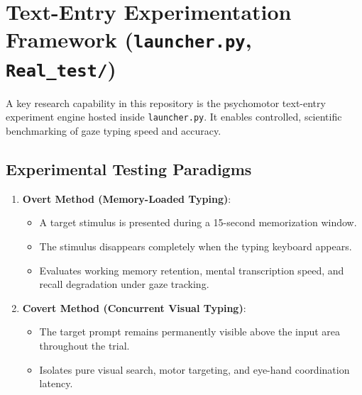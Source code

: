 \documentclass[11pt,a4paper]{article}
\begin{document}
\section{Text-Entry Experimentation Framework (\texttt{launcher.py}, \texttt{Real\_test/})}

A key research capability in this repository is the psychomotor text-entry experiment engine hosted inside \texttt{launcher.py}. It enables controlled, scientific benchmarking of gaze typing speed and accuracy.

\subsection{Experimental Testing Paradigms}
\begin{enumerate}
    \item \textbf{Overt Method (Memory-Loaded Typing)}:
    \begin{itemize}
        \item A target stimulus is presented during a 15-second memorization window.
        \item The stimulus disappears completely when the typing keyboard appears.
        \item Evaluates working memory retention, mental transcription speed, and recall degradation under gaze tracking.
    \end{itemize}
    \item \textbf{Covert Method (Concurrent Visual Typing)}:
    \begin{itemize}
        \item The target prompt remains permanently visible above the input area throughout the trial.
        \item Isolates pure visual search, motor targeting, and eye-hand coordination latency.
    \end{itemize}
\end{enumerate}
\end{document}
